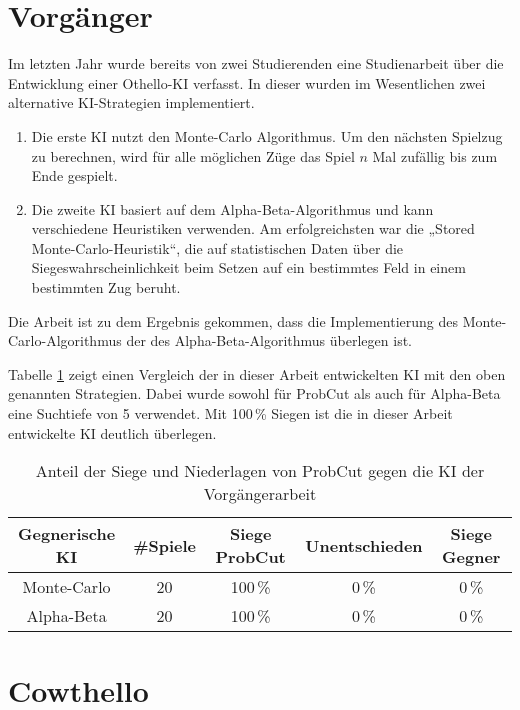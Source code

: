 
\section{Vorgänger}
Im letzten Jahr wurde bereits von zwei Studierenden eine Studienarbeit über die Entwicklung einer Othello-\ac{KI} verfasst.
In dieser wurden im Wesentlichen zwei alternative \ac{KI}-Strategien implementiert.
\begin{enumerate}
    \item Die erste \ac{KI} nutzt den Monte-Carlo Algorithmus. Um den nächsten Spielzug zu berechnen, wird für alle möglichen
    Züge das Spiel $n$ Mal zufällig bis zum Ende gespielt.
    \cite[S.~19]{othellostudienarbeit}
    \item Die zweite \ac{KI} basiert auf dem Alpha-Beta-Algorithmus und kann verschiedene Heuristiken verwenden. Am
    erfolgreichsten war die „Stored Monte-Carlo-Heuristik“, die auf statistischen Daten über die
    Siegeswahrscheinlichkeit beim Setzen auf ein bestimmtes Feld in einem bestimmten Zug beruht.
    \cite[S.~30]{othellostudienarbeit}
\end{enumerate}
Die Arbeit ist zu dem Ergebnis gekommen, dass die Implementierung des Monte-Carlo-Algorithmus der des
Alpha-Beta-Algorithmus überlegen ist.
\cite[S.~55]{othellostudienarbeit}

Tabelle \ref{table:comp:previous} zeigt einen Vergleich der in dieser Arbeit entwickelten \ac{KI} mit den oben genannten
Strategien. Dabei wurde sowohl für ProbCut als auch für Alpha-Beta eine Suchtiefe von 5 verwendet. Mit 100\,\% Siegen
ist die in dieser Arbeit entwickelte \ac{KI} deutlich überlegen.

\begin{table}[H]
\centering
\begin{tabular}{c|c|ccc}
\hline
Gegnerische \ac{KI} & \#Spiele & Siege ProbCut & Unentschieden & Siege Gegner \\
\hline
Monte-Carlo & 20 & 100\,\% & 0\,\% & 0\,\% \\
Alpha-Beta  & 20 & 100\,\% & 0\,\% & 0\,\% \\
\hline
\end{tabular}
\caption{Anteil der Siege und Niederlagen von ProbCut gegen die KI der Vorgängerarbeit}
\label{table:comp:previous}
\end{table}

\section{Cowthello}

